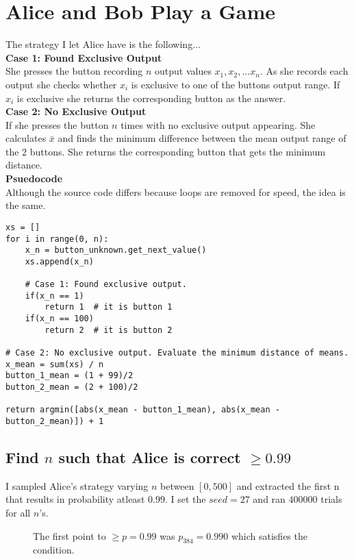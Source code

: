 \documentclass[twocolumn]{article}
\begin{document}
\section{Alice and Bob Play a Game}
The strategy I let Alice have is the following...
\\

\noindent
\textbf{Case 1: Found Exclusive Output}\\
She presses the button recording $n$ output values $x_1, x_2, ... x_n$.
As she records each output she checks whether $x_i$ is exclusive to one of the buttons output range. If $x_i$ is exclusive she returns the corresponding button as the answer.
\\

\textbf{Case 2: No Exclusive Output}\\
If she presses the button $n$ times with no exclusive output appearing. She calculates $\bar{x}$ and finds the minimum difference between the mean output range of the 2 buttons. She returns the corresponding button that gets the minimum distance.
\\

\textbf{Psuedocode}\\
Although the source code differs because loops are removed for speed, the idea is the same.

\pagebreak

\begin{lstlisting}
xs = []
for i in range(0, n):	
	x_n = button_unknown.get_next_value()
	xs.append(x_n) 	
	
	# Case 1: Found exclusive output.
	if(x_n == 1)
		return 1  # it is button 1
	if(x_n == 100)
		return 2  # it is button 2
		
# Case 2: No exclusive output. Evaluate the minimum distance of means.
x_mean = sum(xs) / n
button_1_mean = (1 + 99)/2
button_2_mean = (2 + 100)/2

return argmin([abs(x_mean - button_1_mean), abs(x_mean - button_2_mean)]) + 1
\end{lstlisting}

\subsection*{Find $n$ such that Alice is correct $\ge 0.99$}
I sampled Alice's strategy varying $n$ between $[0, 500]$ and extracted the first n that results in probability atleast $0.99$. I set the $seed=27$ and  ran $400000$ trials for all $n$'s.

\begin{figure}[H]
    \centering
    \caption{The first point to $\ge p=0.99$ was $p_{384}=0.990$ which satisfies the condition.}
    \label{fig:Figure2}
\end{figure}
\end{document}
